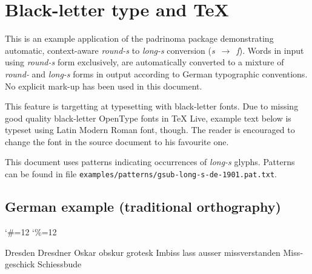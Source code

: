 \documentclass{article}
\begin{document}
\section{Black-letter type and \TeX}

This is an example application of the padrinoma package demonstrating
automatic, context-aware \emph{round-s} to \emph{long-s} conversion
(\emph{s}~$\rightarrow$~\emph{ſ}).  Words in input using \emph{round-s}
form exclusively, are automatically converted to a mixture
of \emph{round-} and \emph{long-s} forms in output according to German
typographic conventions.  No explicit mark-up has been used in this
document.

This feature is targetting at typesetting with black-letter fonts.  Due
to missing good quality black-letter OpenType fonts in TeX Live, example
text below is typeset using Latin Modern Roman font, though.  The reader
is encouraged to change the font in the source document to his favourite
one.

This document uses patterns indicating occurrences of \emph{long-s}
glyphs.  Patterns can be found in
file \texttt{examples/patterns/gsub-long-s-de-1901.pat.txt}.


\subsection{German example (traditional orthography)}

\bgroup
\catcode`\#=12
\catcode`\%=12
\egroup

\begin{otherlanguage}{german}
Dresden Dresdner Oskar obskur grotesk Imbiss lass ausser missverstanden
Missgeschick Schiessbude

\end{otherlanguage}
\end{document}
